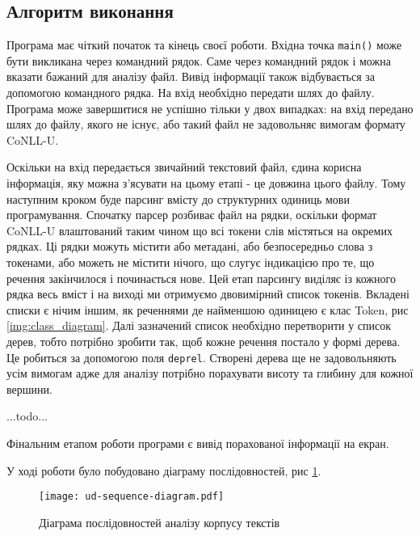 \subsection{Алгоритм виконання}
Програма має чіткий початок та кінець своєї роботи. Вхідна точка \texttt{main()} може
бути викликана через командний рядок. Саме через командний рядок і можна вказати бажаний
для аналізу файл. Вивід інформації також відбувається за допомогою командного
рядка. На вхід необхідно передати шлях до файлу. Програма може завершитися не успішно
тільки у двох випадках: на вхід передано шлях до файлу, якого не існує, або такий
файл не задовольняє вимогам формату CoNLL-U.

Оскільки на вхід передається звичайний текстовий файл, єдина корисна інформація,
яку можна з'ясувати на цьому етапі - це довжина цього файлу. Тому наступним кроком буде
парсинг вмісту до структурних одиниць мови програмування. Спочатку парсер розбиває
файл на рядки, оскільки формат CoNLL-U влаштований таким чином що всі токени слів
містяться на окремих рядках. Ці рядки можуть містити або метадані, або безпосередньо
слова з токенами, або можеть не містити нічого, що слугує індикацією про те, що
речення закінчилося і починається нове. Цей етап парсингу виділяє із кожного рядка
весь вміст і на виході ми отримуємо двовимірний список токенів. Вкладені
списки є нічим іншим, як реченнями де найменшою одиницею є клас Token,
рис \ref{img:class_diagram}. Далі зазначений список необхідно перетворити у список дерев,
тобто потрібно зробити так, щоб кожне речення постало у формі дерева.
Це робиться за допомогою поля \texttt{deprel}. Створені дерева ще не задовольняють
усім вимогам адже для аналізу потрібно порахувати висоту та глибину для кожної вершини.

\begin{center}
    ...todo...
\end{center}

Фінальним етапом роботи програми є вивід порахованої інформації на екран.

У ході роботи було побудовано діаграму послідовностей, рис \ref{img:sequence_diagram}.

\begin{figure}[p]
  \begin{center}
    \texttt{[image: ud-sequence-diagram.pdf]}
  \end{center}
  \caption{Діаграма послідовностей аналізу корпусу текстів}
  \label{img:sequence_diagram}
\end{figure}
\newpage


